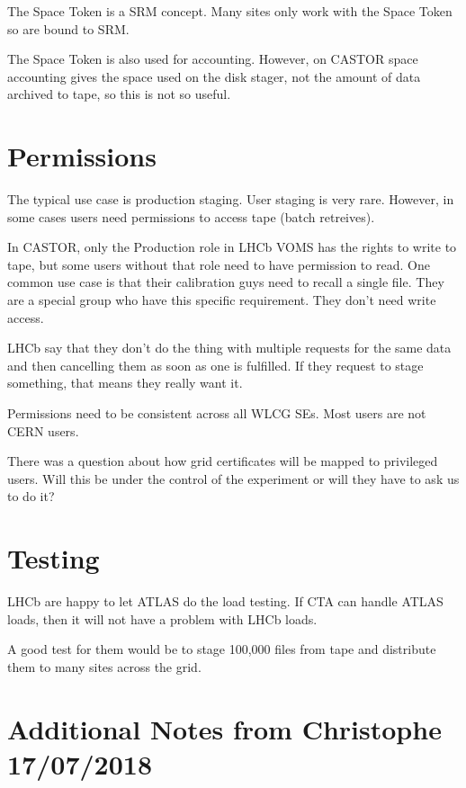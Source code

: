 \documentclass{lhcb+cta}
\begin{document}
The Space Token is a SRM concept. Many sites only work with the Space Token so are bound to SRM.

The Space Token is also used for accounting. However, on CASTOR space accounting gives the space used on the disk stager, not the amount of data archived to tape, so this is not so useful.


\section*{Permissions}

The typical use case is production staging. User staging is very rare. However, in some cases users need permissions to access tape (batch retreives).

In CASTOR, only the Production role in LHCb VOMS has the rights to write to tape, but some users without that role need to have permission to read. One common use case is that their calibration guys need to recall a single file. They are a special group who have this specific requirement. They don't need write access.

LHCb say that they don't do the thing with multiple requests for the same data and then cancelling them as soon as one is fulfilled. If they request to stage something, that means they really want it.

Permissions need to be consistent across all WLCG SEs. Most users are not CERN users.

There was a question about how grid certificates will be mapped to privileged users. Will this be under the control of the experiment or will they have to ask us to do it?

\section*{Testing}

LHCb are happy to let ATLAS do the load testing. If CTA can handle ATLAS loads, then it will not have a problem with LHCb loads.

A good test for them would be to stage 100,000 files from tape and distribute them to many sites across the grid.

\section*{Additional Notes from Christophe 17/07/2018}
\end{document}
